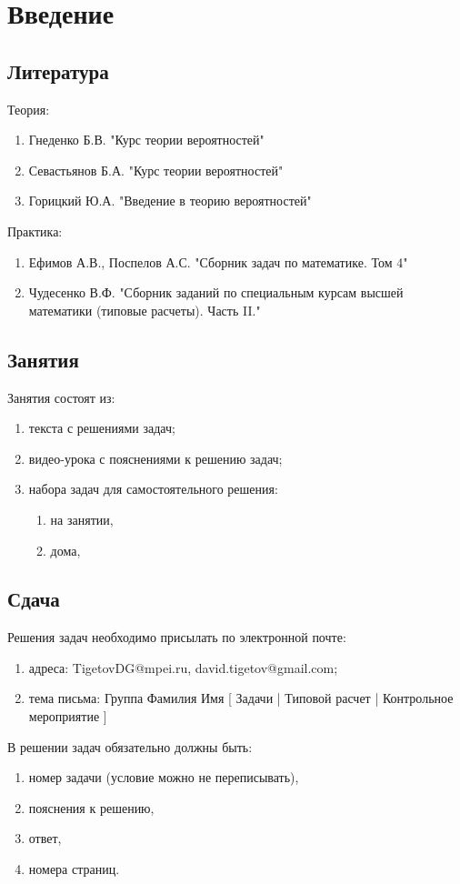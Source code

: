 \chapter{Введение}


\section{Литература}

Теория:
\begin{enumerate}
    \item Гнеденко Б.В. "Курс теории вероятностей"
    \item Севастьянов Б.А. "Курс теории вероятностей"
    \item Горицкий Ю.А. "Введение в теорию вероятностей"
\end{enumerate}

Практика:
\begin{enumerate}
    \item Ефимов А.В., Поспелов А.С. "Сборник задач по математике. Том 4"
    \item Чудесенко В.Ф. "Сборник заданий по специальным курсам высшей математики (типовые расчеты). Часть II."
\end{enumerate}


\section{Занятия}

Занятия состоят из:
\begin{enumerate}
    \item текста с решениями задач;
    \item видео-урока с пояснениями к решению задач;
    \item набора задач для самостоятельного решения:
    \begin{enumerate}
        \item на занятии,
        \item дома,
    \end{enumerate}
\end{enumerate}


\section{Сдача}

Решения задач необходимо присылать по электронной почте:
\begin{enumerate}
    \item адреса: TigetovDG@mpei.ru, david.tigetov@gmail.com;
    \item тема письма: Группа Фамилия Имя [ Задачи | Типовой расчет | Контрольное мероприятие ]
\end{enumerate}

В решении задач обязательно должны быть:
\begin{enumerate}
    \item номер задачи (условие можно не переписывать),
    \item пояснения к решению,
    \item ответ,
    \item номера страниц.
\end{enumerate}